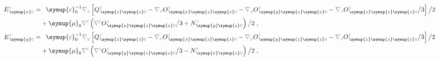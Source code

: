 \begin{subequations}
\begin{align}
	E^{\;\!\mathcolor{gray}{t}}_{\;\! \symup{x}\mathcolor{gray}{0}} = &\hphantom{+} {\symup{\varepsilon}}_0^{-1} \mathcolor{gray}{\nabla_x} \left[ Q^{\;\!\mathcolor{gray}{t}}_{\;\! \symup{z} \symup{z} \mathcolor{gray}{0}} - \mathcolor{gray}{\nabla_x} O^{\;\!\mathcolor{gray}{t}}_{\;\! \symup{x} \symup{z} \symup{z} \mathcolor{gray}{0}} - \mathcolor{gray}{\nabla_y}  O^{\;\!\mathcolor{gray}{t}}_{\;\! \symup{y} \symup{z} \symup{z}  \mathcolor{gray}{0}} - \mathcolor{gray}{\nabla_z}  O^{\;\!\mathcolor{gray}{t}}_{\;\! \symup{z} \symup{z} \symup{z} \mathcolor{gray}{0}} \big/ 3 \right] \big/ 2 \label{eq:E_x0==} \\ &+ {\symup{\mu}}_0 \mathcolor{gray}{\nabla^t} \left( \mathcolor{gray}{\nabla^t} O^{\;\!\mathcolor{gray}{t}}_{\;\!\symup{x} \symup{z} \symup{z} \mathcolor{gray}{0}} \big/ 3 + N^{\;\!\mathcolor{gray}{t}}_{\;\! \symup{y} \symup{z} \mathcolor{gray}{0}} \right) \big/ 2 ~, \\ E^{\;\!\mathcolor{gray}{t}}_{\;\! \symup{y}\mathcolor{gray}{0}} = &\hphantom{+} {\symup{\varepsilon}}_0^{-1} \mathcolor{gray}{\nabla_y} \left[ Q^{\;\!\mathcolor{gray}{t}}_{\;\! \symup{z} \symup{z} \mathcolor{gray}{0}} - \mathcolor{gray}{\nabla_x} O^{\;\!\mathcolor{gray}{t}}_{\;\! \symup{x} \symup{z} \symup{z} \mathcolor{gray}{0}} - \mathcolor{gray}{\nabla_y}  O^{\;\!\mathcolor{gray}{t}}_{\;\! \symup{y} \symup{z} \symup{z} \mathcolor{gray}{0}} - \mathcolor{gray}{\nabla_z}  O^{\;\!\mathcolor{gray}{t}}_{\;\! \symup{z} \symup{z} \symup{z} \mathcolor{gray}{0}} \big/ 3 \right] \big/ 2 \label{eq:E_y0==} \\ &+ {\symup{\mu}}_0 \mathcolor{gray}{\nabla^t} \left( \mathcolor{gray}{\nabla^t} O^{\;\!\mathcolor{gray}{t}}_{\;\! \symup{y} \symup{z} \symup{z} \mathcolor{gray}{0}} \big/ 3 - N^{\;\!\mathcolor{gray}{t}}_{\;\! \symup{x} \symup{z} \mathcolor{gray}{0}} \right) \big/ 2 ~, \\

\end{align}
\end{subequations}
